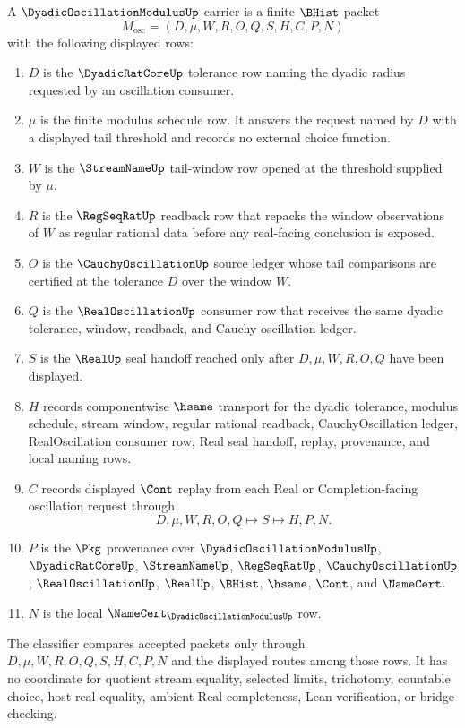\begin{definition}
\label{def:dyadic-oscillation-modulus-carrier}
A $\DyadicOscillationModulusUp$ carrier is a finite $\BHist$ packet
$$
M_{\mathrm{osc}}=(D,\mu,W,R,O,Q,S,H,C,P,N)
$$
with the following displayed rows:
\begin{enumerate}
\item $D$ is the $\DyadicRatCoreUp$ tolerance row naming the dyadic radius requested by an oscillation consumer.
\item $\mu$ is the finite modulus schedule row. It answers the request named by $D$ with a displayed tail threshold and records no external choice function.
\item $W$ is the $\StreamNameUp$ tail-window row opened at the threshold supplied by $\mu$.
\item $R$ is the $\RegSeqRatUp$ readback row that repacks the window observations of $W$ as regular rational data before any real-facing conclusion is exposed.
\item $O$ is the $\CauchyOscillationUp$ source ledger whose tail comparisons are certified at the tolerance $D$ over the window $W$.
\item $Q$ is the $\RealOscillationUp$ consumer row that receives the same dyadic tolerance, window, readback, and Cauchy oscillation ledger.
\item $S$ is the $\RealUp$ seal handoff reached only after $D,\mu,W,R,O,Q$ have been displayed.
\item $H$ records componentwise $\hsame$ transport for the dyadic tolerance, modulus schedule, stream window, regular rational readback, CauchyOscillation ledger, RealOscillation consumer row, Real seal handoff, replay, provenance, and local naming rows.
\item $C$ records displayed $\Cont$ replay from each Real or Completion-facing oscillation request through
$$
D,\mu,W,R,O,Q \longmapsto S \longmapsto H,P,N .
$$
\item $P$ is the $\Pkg$ provenance over $\DyadicOscillationModulusUp$, $\DyadicRatCoreUp$, $\StreamNameUp$, $\RegSeqRatUp$, $\CauchyOscillationUp$, $\RealOscillationUp$, $\RealUp$, $\BHist$, $\hsame$, $\Cont$, and $\NameCert$.
\item $N$ is the local $\NameCert_{\DyadicOscillationModulusUp}$ row.
\end{enumerate}
The classifier compares accepted packets only through $D,\mu,W,R,O,Q,S,H,C,P,N$ and the displayed routes among those rows. It has no coordinate for quotient stream equality, selected limits, trichotomy, countable choice, host real equality, ambient Real completeness, Lean verification, or bridge checking.
\end{definition}

